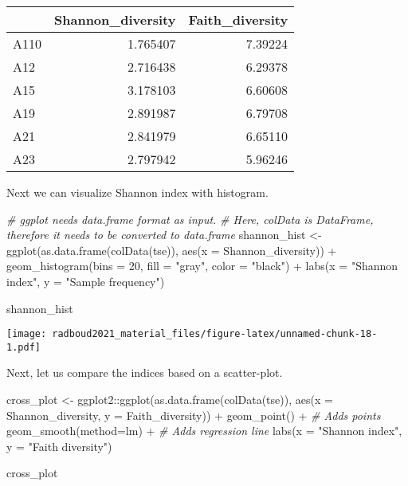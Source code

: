 \documentclass[
]{book}
\newenvironment{Shaded}{\begin{snugshade}}{\end{snugshade}}
\newcommand{\AttributeTok}[1]{\textcolor[rgb]{0.77,0.63,0.00}{#1}}
\newcommand{\CommentTok}[1]{\textcolor[rgb]{0.56,0.35,0.01}{\textit{#1}}}
\newcommand{\DecValTok}[1]{\textcolor[rgb]{0.00,0.00,0.81}{#1}}
\newcommand{\FunctionTok}[1]{\textcolor[rgb]{0.00,0.00,0.00}{#1}}
\newcommand{\NormalTok}[1]{#1}
\newcommand{\OtherTok}[1]{\textcolor[rgb]{0.56,0.35,0.01}{#1}}
\newcommand{\SpecialCharTok}[1]{\textcolor[rgb]{0.00,0.00,0.00}{#1}}
\newcommand{\StringTok}[1]{\textcolor[rgb]{0.31,0.60,0.02}{#1}}
\begin{document}
\begin{table}
\centering
\begin{tabular}{l|r|r}
\hline
  & Shannon\_diversity & Faith\_diversity\\
\hline
A110 & 1.765407 & 7.39224\\
\hline
A12 & 2.716438 & 6.29378\\
\hline
A15 & 3.178103 & 6.60608\\
\hline
A19 & 2.891987 & 6.79708\\
\hline
A21 & 2.841979 & 6.65110\\
\hline
A23 & 2.797942 & 5.96246\\
\hline
\end{tabular}
\end{table}

Next we can visualize Shannon index with histogram.

\begin{Shaded}
\begin{Highlighting}[]
\CommentTok{\# ggplot needs data.frame format as input.}
\CommentTok{\# Here, colData is DataFrame, therefore it needs to be converted to data.frame}
\NormalTok{shannon\_hist }\OtherTok{\textless{}{-}} \FunctionTok{ggplot}\NormalTok{(}\FunctionTok{as.data.frame}\NormalTok{(}\FunctionTok{colData}\NormalTok{(tse)), }
                       \FunctionTok{aes}\NormalTok{(}\AttributeTok{x =}\NormalTok{ Shannon\_diversity)) }\SpecialCharTok{+} 
  \FunctionTok{geom\_histogram}\NormalTok{(}\AttributeTok{bins =} \DecValTok{20}\NormalTok{, }\AttributeTok{fill =} \StringTok{"gray"}\NormalTok{, }\AttributeTok{color =} \StringTok{"black"}\NormalTok{) }\SpecialCharTok{+}
  \FunctionTok{labs}\NormalTok{(}\AttributeTok{x =} \StringTok{"Shannon index"}\NormalTok{, }\AttributeTok{y =} \StringTok{"Sample frequency"}\NormalTok{)}

\NormalTok{shannon\_hist}
\end{Highlighting}
\end{Shaded}

\texttt{[image: radboud2021\_material\_files/figure-latex/unnamed-chunk-18-1.pdf]}

Next, let us compare the indices based on a scatter-plot.

\begin{Shaded}
\begin{Highlighting}[]
\NormalTok{cross\_plot }\OtherTok{\textless{}{-}}\NormalTok{ ggplot2}\SpecialCharTok{::}\FunctionTok{ggplot}\NormalTok{(}\FunctionTok{as.data.frame}\NormalTok{(}\FunctionTok{colData}\NormalTok{(tse)), }
                                     \FunctionTok{aes}\NormalTok{(}\AttributeTok{x =}\NormalTok{ Shannon\_diversity, }\AttributeTok{y =}\NormalTok{ Faith\_diversity)) }\SpecialCharTok{+} 
  \FunctionTok{geom\_point}\NormalTok{() }\SpecialCharTok{+} \CommentTok{\# Adds points}
  \FunctionTok{geom\_smooth}\NormalTok{(}\AttributeTok{method=}\NormalTok{lm) }\SpecialCharTok{+} \CommentTok{\# Adds regression line}
  \FunctionTok{labs}\NormalTok{(}\AttributeTok{x =} \StringTok{"Shannon index"}\NormalTok{, }\AttributeTok{y =} \StringTok{"Faith diversity"}\NormalTok{) }

\NormalTok{cross\_plot}
\end{Highlighting}
\end{Shaded}
\end{document}
